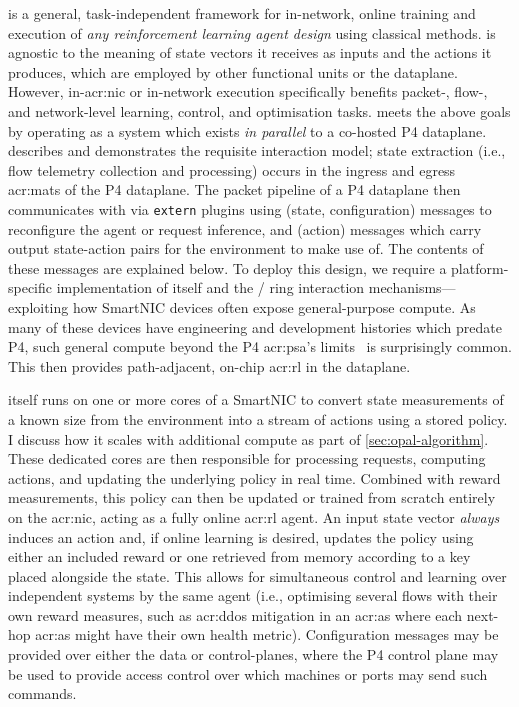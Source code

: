 \approachshort{} is a general, task-independent framework for in-network, online training and execution of \emph{any reinforcement learning agent design} using classical methods.
\approachshort{} is agnostic to the meaning of state vectors it receives as inputs and the actions it produces, which are employed by other functional units or the dataplane.
However, in-\gls{acr:nic} or in-network execution specifically benefits packet-, flow-, and network-level learning, control, and optimisation tasks.
\approachshort{} meets the above goals by operating as a system which exists \emph{in parallel} to a co-hosted P4 dataplane.
 describes and demonstrates the requisite interaction model; state extraction (i.e., flow telemetry collection and processing) occurs in the ingress and egress \glspl{acr:mat} of the P4 dataplane.
The packet pipeline of a P4 dataplane then communicates with \approachshort{} via \texttt{extern} plugins using \inring{} (state, configuration) messages to reconfigure the agent or request inference, and \outring{} (action) messages which carry output state-action pairs for the environment to make use of.
The contents of these messages are explained below.
To deploy this design, we require a platform-specific implementation of \approachshort{} itself and the \inring{}/\outring{} ring interaction mechanisms---exploiting how SmartNIC devices often expose general-purpose compute.
As many of these devices have engineering and development histories which predate P4, such general compute beyond the P4 \gls{acr:psa}'s limits~\parencite{p4-psa} is surprisingly common.
This then provides path-adjacent, on-chip \gls{acr:rl} in the dataplane.

\approachshort{} itself runs on one or more cores of a SmartNIC to convert state measurements of a known size from the environment into a stream of actions using a stored policy.
I discuss how it scales with additional compute as part of \cref{sec:opal-algorithm}.
These dedicated cores are then responsible for processing requests, computing actions, and updating the underlying policy in real time.
Combined with reward measurements, this policy can then be updated or trained from scratch entirely on the \gls{acr:nic}, acting as a fully online \gls{acr:rl} agent.
An input state vector \emph{always} induces an action and, if online learning is desired, updates the policy using either an included reward or one retrieved from memory according to a key placed alongside the state.
This allows for simultaneous control and learning over independent systems by the same agent (i.e., optimising several flows with their own reward measures, such as \gls{acr:ddos} mitigation in an \gls{acr:as} where each next-hop \gls{acr:as} might have their own health metric).
Configuration messages may be provided over either the data or control-planes, where the P4 control plane may be used to provide access control over which machines or ports may send such commands.

